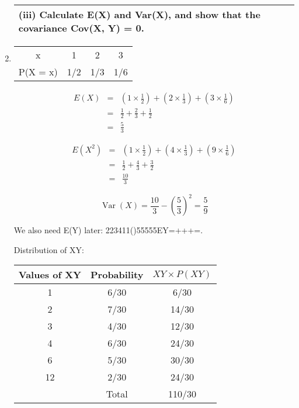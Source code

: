 \documentclass[a4paper,12pt]{article}
\begin{document}
\begin{enumerate}
\begin{table}[ht!]
 
\centering
 
\begin{tabular}{|p{15cm}|}
 
\hline

\noindent

(iii) Calculate E(X) and Var(X), and show that the covariance Cov(X, Y) = 0.
\\ \hline
  
\end{tabular}

\end{table}

\item 

\begin{center}
\begin{tabular}{|c|c|c|c|}
x & 1 & 2 & 3 \\
P(X = x) & 1/2 & 1/3 & 1/6 \\
\end{tabular}
\end{center}

\begin{eqnarray*}
E(X) &=& \left(  1 \times  \frac{1}{2} \right) +  \left( 2 \times    \frac{1}{3} \right) +  \left( 3 \times   \frac{1}{6} \right) \\
&=& \frac{1}{2} + \frac{2}{3} + \frac{1}{2} \\
&=& \frac{5}{3}
\end{eqnarray*}

\begin{eqnarray*}
E(X^2) &=& \left(  1 \times  \frac{1}{2} \right) +  \left( 4 \times    \frac{1}{3} \right) +  \left( 9 \times   \frac{1}{6} \right) \\
&=& \frac{1}{2} + \frac{4}{3} + \frac{3}{2} \\
&=& \frac{10}{3}
\end{eqnarray*}

\[ \operatorname{Var}(X) = \frac{10}{3} - \left( \frac{5}{3} \right)^2 = \frac{5}{9}\]

We also need E(Y) later: 223411()55555EY=+++=.


Distribution of XY:
\begin{center}
\begin{tabular}{|c|c|c|} \hline 
Values of XY & Probability & $XY \times P(XY)$\\ \hline
1 & 6/30 & 6/30 \\ \hline 
2 & 7/30 & 14/30 \\ \hline 
3 & 4/30 &  12/30 \\ \hline 
4 & 6/30 &  24/30 \\ \hline
6 & 5/30 &  30/30 \\ \hline
12 & 2/30 &  24/30 \\ \hline
& Total & 110/30 \\ \hline 
\end{tabular}
\end{center}



\end{enumerate}
\end{document}
